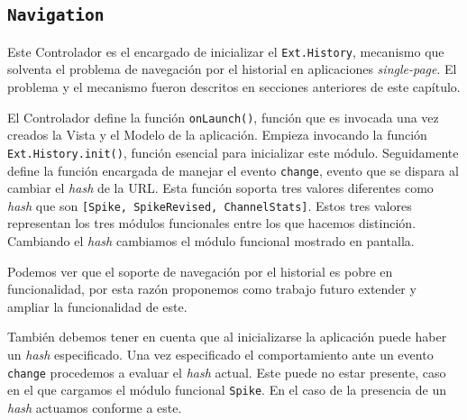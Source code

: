 	\subsection{\texttt{Navigation}}
		Este Controlador es el encargado de inicializar el \texttt{Ext.History}, mecanismo que solventa el problema de navegación por el
		historial en aplicaciones \emph{single-page}. El problema y el mecanismo fueron descritos en secciones anteriores de este capítulo.
		\par
		El Controlador define la función \texttt{onLaunch()}, función que es invocada una vez creados la Vista y el Modelo de la aplicación.
		Empieza invocando la función \texttt{Ext.History.init()}, función esencial para inicializar este módulo. Seguidamente define la
		función encargada de manejar el evento \texttt{change}, evento que se dispara al cambiar el \emph{hash} de la URL. Esta función
		soporta tres valores diferentes como \emph{hash} que son \texttt{[Spike, SpikeRevised, ChannelStats]}. Estos tres valores representan
		los tres módulos funcionales entre los que hacemos distinción. Cambiando el \emph{hash} cambiamos el módulo funcional mostrado en
		pantalla.
		\par
		Podemos ver que el soporte de navegación por el historial es pobre en funcionalidad, por esta razón proponemos como trabajo futuro
		extender y ampliar la funcionalidad de este.
		\par
		También debemos tener en cuenta que al inicializarse la aplicación puede haber un \emph{hash} especificado. Una vez especificado el
		comportamiento ante un evento \texttt{change} procedemos a evaluar el \emph{hash} actual. Este puede no estar presente, caso en el que
		cargamos el módulo funcional \texttt{Spike}. En el caso de la presencia de un \emph{hash} actuamos conforme a este.
